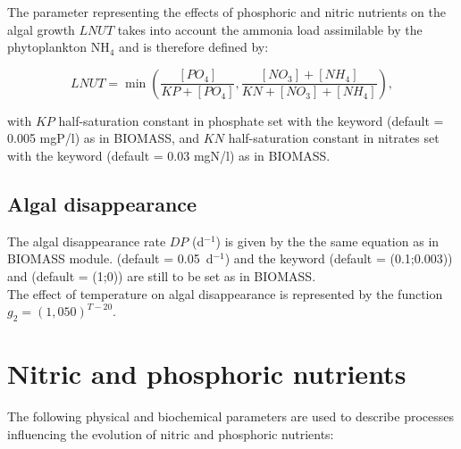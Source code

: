 The parameter representing the effects of phosphoric
and nitric nutrients on the algal growth $LNUT$ takes into account
the ammonia load assimilable by the phytoplankton NH$_4$ and is therefore defined by:

\begin{equation}
  LNUT = \min \left( \frac{[PO_4]}{KP+[PO_4]}, \frac{[NO_3]+[NH_4]}{KN+[NO_3]+[NH_4]} \right),
\end{equation}

with $KP$ half-saturation constant in phosphate
set with the keyword 
(default = 0.005 mgP/l) as in BIOMASS,
and $KN$ half-saturation constant in nitrates
set with the keyword 
(default = 0.03 mgN/l) as in BIOMASS.\\

\subsection{Algal disappearance}

The algal disappearance rate $DP$ (d$^{-1}$) is given
by the the same equation as in BIOMASS module.
(default = 0.05~d$^{-1}$) and the keyword
 (default = (0.1;0.003))
and  (default = (1;0))
are still to be set as in BIOMASS.\\

The effect of temperature on algal disappearance
is represented by the function $g_2 = (1,050)^{T-20}$.

\section{Nitric and phosphoric nutrients}

The following physical and biochemical parameters are used to describe processes
influencing the evolution of nitric and phosphoric nutrients:

